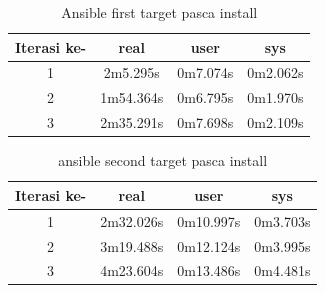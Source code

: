 \documentclass[10pt,twoside]{report}
\begin{document}
\begin{adjustwidth}{20pt}{}
\begin{adjustwidth}{20pt}{}
		\begin{table}[H]
			\caption{Ansible first target pasca install}
			\begin{center}
				\begin{tabular}[c]{|c|c|c|c|}
					\hline
					\multicolumn{1}{|c|}{\textbf{Iterasi ke-}} &
					\multicolumn{1}{c|}{\textbf{real}}         &
					\multicolumn{1}{c|}{\textbf{user}}         &
					\multicolumn{1}{c|}{\textbf{sys}}                                            \\
					\hline
					1                                          & 2m5.295s  & 0m7.074s & 0m2.062s \\
					\hline
					2                                          & 1m54.364s & 0m6.795s & 0m1.970s \\
					\hline
					3                                          & 2m35.291s & 0m7.698s & 0m2.109s \\
					\hline
				\end{tabular}
			\end{center}
		\end{table}
		\vspace{-5mm}

		\begin{table}[H]
			\caption{ansible second target pasca install}
			\begin{center}
				\begin{tabular}[c]{|c|c|c|c|}
					\hline
					\multicolumn{1}{|c|}{\textbf{Iterasi ke-}} &
					\multicolumn{1}{c|}{\textbf{real}}         &
					\multicolumn{1}{c|}{\textbf{user}}         &
					\multicolumn{1}{c|}{\textbf{sys}}                                             \\
					\hline
					1                                          & 2m32.026s & 0m10.997s & 0m3.703s \\
					\hline
					2                                          & 3m19.488s & 0m12.124s & 0m3.995s \\
					\hline
					3                                          & 4m23.604s & 0m13.486s & 0m4.481s \\
					\hline
				\end{tabular}
			\end{center}
		\end{table}
	\end{adjustwidth}

\end{adjustwidth}
\end{document}
